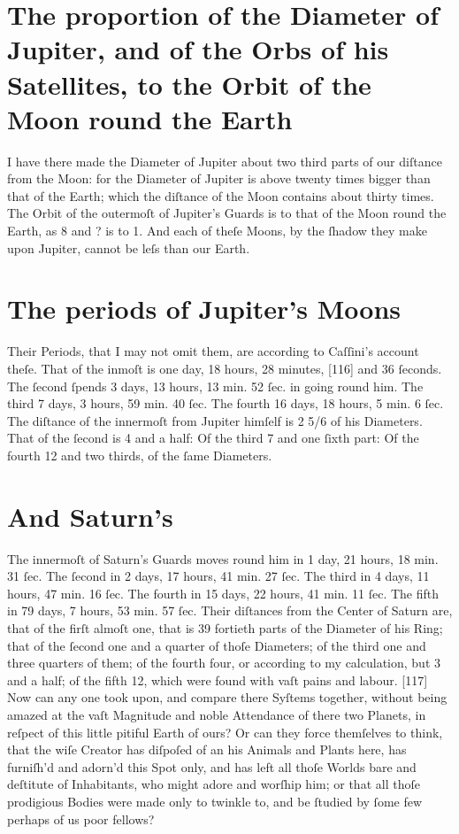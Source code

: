 \documentclass[letterpaper]{book}
\begin{document}
\section{The proportion of the Diameter of Jupiter, and of
the Orbs of his Satellites, to the Orbit of the Moon
round the Earth}

I have there made the Diameter of Jupiter about two third parts of our
diſtance from the Moon: for the Diameter of Jupiter is above twenty times
bigger than that of the Earth; which the diſtance of the Moon contains
about thirty times. The Orbit of the outermoſt of Jupiter's Guards is to
that of the Moon round the Earth, as 8 and ? is to 1. And each of theſe
Moons, by the ſhadow they make upon Jupiter, cannot be leſs than our
Earth.


\section{The periods of Jupiter's Moons}

Their Periods, that I may not omit them, are according to Caſſini's account
theſe. That of the inmoſt is one day, 18 hours, 28 minutes, [116] and 36
ſeconds. The ſecond ſpends 3 days, 13 hours, 13 min. 52 ſec. in going
round him. The third 7 days, 3 hours, 59 min. 40 ſec. The fourth 16 days,
18 hours, 5 min. 6 ſec. The diſtance of the innermoſt from Jupiter himſelf
is 2 5/6 of his Diameters. That of the ſecond is 4 and a half: Of the third 7
and one ſixth part: Of the fourth 12 and two thirds, of the ſame Diameters.


\section{And Saturn's}

The innermoſt of Saturn's Guards moves round him in 1 day, 21 hours, 18 min.
31 ſec. The ſecond in 2 days, 17 hours, 41 min. 27 ſec. The third in 4 days,
11 hours, 47 min. 16 ſec. The fourth in 15 days, 22 hours, 41 min. 11 ſec.
The fifth in 79 days, 7 hours, 53 min. 57 ſec. Their diſtances from the
Center of Saturn are, that of the firſt almoſt one, that is 39 fortieth
parts of the Diameter of his Ring; that of the ſecond one and a quarter of
thoſe Diameters; of the third one and three quarters of them; of the fourth
four, or according to my calculation, but 3 and a half; of the fifth 12,
which were found with vaſt pains and labour.  [117] Now can any one took
upon, and compare there Syſtems together, without being amazed at the vaſt
Magnitude and noble Attendance of there two Planets, in reſpect of this
little pitiful Earth of ours? Or can they force themſelves to think, that
the wiſe Creator has diſpoſed of an his Animals and Plants here, has
furniſh'd and adorn'd this Spot only, and has left all thoſe Worlds bare and
deſtitute of Inhabitants, who might adore and worſhip him; or that all thoſe
prodigious Bodies were made only to twinkle to, and be ſtudied by ſome few
perhaps of us poor fellows?
\end{document}
